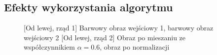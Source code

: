 \documentclass[a4paper,12pt, titlepage]{report}
\begin{document}
\subsection*{Efekty wykorzystania algorytmu}
\begin{figure}[h]
    \centering
    \qquad
    \caption{[Od lewej, rząd 1] Barwowy obraz wejściowy 1, barwowy obraz wejściowy 2 [Od lewej, rząd 2] Obraz po mieszaniu ze współczynnikiem \(\alpha=0.6\), obraz po normalizacji}%
    \label{fig:geo_after_grey1}%
\end{figure}
\end{document}
